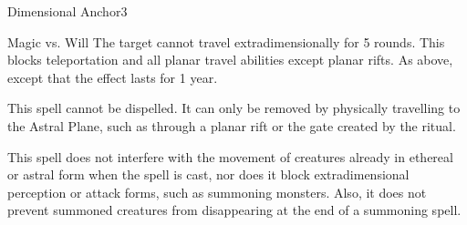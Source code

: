 \begin{spellsection}{Dimensional Anchor}{3}
    \begin{spellheader}
    \end{spellheader}
    \begin{spellcontent}
        \begin{spelltargetinginfo}
        \end{spelltargetinginfo}
        \begin{spelleffects}
            \begin{spellattack}{Magic vs. Will}
                \spellsuccess  The target cannot travel extradimensionally for 5 rounds. This blocks teleportation and all planar travel abilities except planar rifts.
                \spellcritical As above, except that the effect lasts for 1 year.
            \end{spellattack}
        \end{spelleffects}
    \end{spellcontent}
    \begin{spellfooter}
        \spellnotes This spell cannot be dispelled. It can only be removed by physically travelling to the Astral Plane, such as through a planar rift or the gate created by the  ritual.

        This spell does not interfere with the movement of creatures already in ethereal or astral form when the spell is cast, nor does it block extradimensional perception or attack forms, such as summoning monsters. Also, it does not prevent summoned creatures from disappearing at the end of a summoning spell.
        \miscastrandom
    \end{spellfooter}
\end{spellsection}


